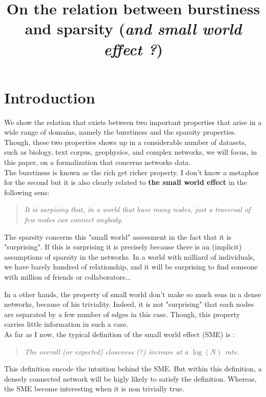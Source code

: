 \documentclass[a4paper, 12pt]{article}
\title{On the relation between burstiness and sparsity (\emph{and small world effect ?})}
\begin{document}
\maketitle

\section{Introduction}

We show the relation that exists between two important properties that arise in a wide range of domains, namely the burstiness and the sparsity properties. Though, these two properties shows up in a considerable number of datasets, such as biology, text corpus, geophysics, and complex networks, we will focus, in this paper, on a formalization that concerns networks data.~\\

The burstiness is known as the rich get richer property. I don't know a metaphor for the second but it is also clearly related to \textbf{the small world effect} in the following sens: 

\begin{quote}
    \emph{It is surpising that, in a world that have many nodes, just a traversal of few nodes can connect anybody.}
\end{quote}

The sparsity concerns this "small world" assessment in the fact that it is "surprising". If this is surprising it is precisely because there is an (implicit) assumptions of sparsity in the networks. In a world with milliard of individuals, we have barely hundred of relationship, and it will be surprising to find someone with million of friends or collaborators...

In a other hands, the property of small world don't make so much sens in a dense networks, because of his triviality. Indeed, it is not "surprising" that each nodes are separated by a few number of edges in this case. Though, this property carries little information in such a case.  ~\\

As far as I now, the typical definition of the small world effect (SME) is :
\begin{quote}
    \emph{The overall (or expected) closeness (?) increase at a $\log(N)$ rate.}
\end{quote}

This definition encode the intuition behind the SME. But within this definition, a densely connected network will be higly likely to satisfy the definition. Whereas, the SME become interesting when it is non trivially true.~\\
\end{document}
